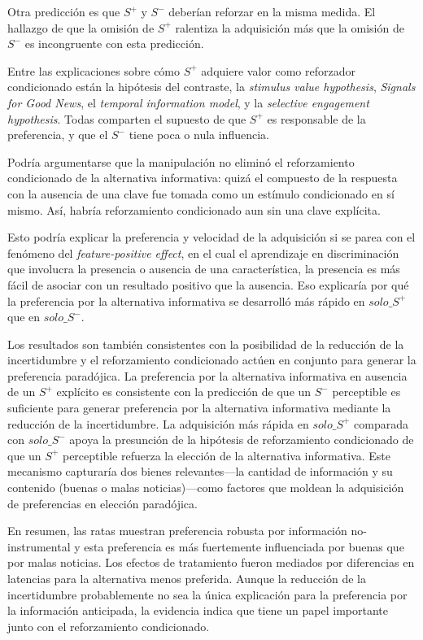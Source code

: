 \documentclass[a4paper,12pt]{article}
\begin{document}
Otra predicción es que $S^{+}$ y $S^{-}$ deberían reforzar en la misma medida. El hallazgo de que la omisión de $S^{+}$ ralentiza la adquisición más que la omisión de $S^{-}$ es incongruente con esta predicción.

Entre las explicaciones sobre cómo $S^{+}$ adquiere valor como reforzador condicionado están la hipótesis del contraste, la {\itshape stimulus value hypothesis}, {\itshape Signals for Good News}, el {\itshape temporal information model}, y la {\itshape selective engagement hypothesis}. Todas comparten el supuesto de que $S^{+}$ es responsable de la preferencia, y que el $S^{-}$ tiene poca o nula influencia.

Podría argumentarse que la manipulación no eliminó el reforzamiento condicionado de la alternativa informativa: quizá el compuesto de la respuesta con la ausencia de una clave fue tomada como un estímulo condicionado en sí mismo. Así, habría reforzamiento condicionado aun sin una clave explícita.

Esto podría explicar la preferencia y velocidad de la adquisición si se parea con el fenómeno del {\itshape feature-positive effect}, en el cual el aprendizaje en discriminación que involucra la presencia o ausencia de una característica, la presencia es más fácil de asociar con un resultado positivo que la ausencia. Eso explicaría por qué la preferencia por la alternativa informativa se desarrolló más rápido en $solo\_S^{+}$ que en $solo\_S^{-}$.

Los resultados son también consistentes con la posibilidad de la reducción de la incertidumbre y el reforzamiento condicionado actúen en conjunto para generar la preferencia paradójica. La preferencia por la alternativa informativa en ausencia de un $S^{+}$ explícito es consistente con la predicción de que un $S^{-}$ perceptible es suficiente para generar preferencia por la alternativa informativa mediante la reducción de la incertidumbre. La adquisición más rápida en $solo\_S^{+}$ comparada con $solo\_S^{-}$ apoya la presunción de la hipótesis de reforzamiento condicionado de que un $S^{+}$ perceptible refuerza la elección de la alternativa informativa. Este mecanismo capturaría dos bienes relevantes---la cantidad de información y su contenido (buenas o malas noticias)---como factores que moldean la adquisición de preferencias en elección paradójica.

En resumen, las ratas muestran preferencia robusta por información no-instrumental y esta preferencia es más fuertemente influenciada por buenas que por malas noticias. Los efectos de tratamiento fueron mediados por diferencias en latencias para la alternativa menos preferida. Aunque la reducción de la incertidumbre probablemente no sea la única explicación para la preferencia por la información anticipada, la evidencia indica que tiene un papel importante junto con el reforzamiento condicionado.
\end{document}
